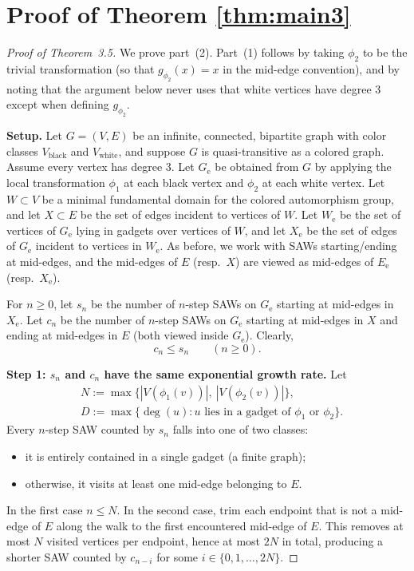 \documentclass[12pt]{amsart}
\theoremstyle{plain}
\numberwithin{equation}{section}
\numberwithin{theorem}{section}
\numberwithin{figure}{section}
\begin{document}
\section{Proof of Theorem \ref{thm:main3}}\label{sec:proof3}



\begin{proof}[Proof of Theorem~3.5]
We prove part~(2). Part~(1) follows by taking $\phi_2$ to be the trivial
transformation (so that $g_{\phi_2}(x)=x$ in the mid-edge convention), and by
noting that the argument below never uses that white vertices have degree $3$
except when defining $g_{\phi_2}$.

\medskip
\noindent\textbf{Setup.}
Let $G=(V,E)$ be an infinite, connected, bipartite graph with color classes
$V_{\mathrm{black}}$ and $V_{\mathrm{white}}$, and suppose $G$ is quasi-transitive as a colored graph.
Assume every vertex has degree $3$.
Let $G_{\mathrm e}$ be obtained from $G$ by applying the local transformation
$\phi_1$ at each black vertex and $\phi_2$ at each white vertex.
Let $W\subset V$ be a minimal fundamental domain for the colored automorphism group,
and let $X\subset E$ be the set of edges incident to vertices of $W$.
Let $W_{\mathrm e}$ be the set of vertices of $G_{\mathrm e}$ lying in gadgets
over vertices of $W$, and let $X_{\mathrm e}$ be the set of edges of $G_{\mathrm e}$
incident to vertices in $W_{\mathrm e}$.
As before, we work with SAWs starting/ending at mid-edges, and the mid-edges of $E$
(resp.\ $X$) are viewed as mid-edges of $E_{\mathrm e}$ (resp.\ $X_{\mathrm e}$).

For $n\ge0$, let $s_n$ be the number of $n$-step SAWs on $G_{\mathrm e}$ starting at
mid-edges in $X_{\mathrm e}$.
Let $c_n$ be the number of $n$-step SAWs on $G_{\mathrm e}$ starting at mid-edges in $X$
and ending at mid-edges in $E$ (both viewed inside $G_{\mathrm e}$).
Clearly,
\begin{equation}\label{eq:cn-le-sn}
c_n \le s_n \qquad (n\ge0).
\end{equation}

\medskip
\noindent\textbf{Step 1: $s_n$ and $c_n$ have the same exponential growth rate.}
Let
\begin{align*}
&N:=\max\{|V(\phi_1(v))|,\ |V(\phi_2(v))|\},\\
&D:=\max\{\deg(u): u\text{ lies in a gadget of }\phi_1\text{ or }\phi_2\}.
\end{align*}
Every $n$-step SAW counted by $s_n$ falls into one of two classes:
\begin{itemize}
\item it is entirely contained in a single gadget (a finite graph);
\item otherwise, it visits at least one mid-edge belonging to $E$.
\end{itemize}
In the first case $n\leq N$.
In the second case, trim each endpoint that is not a mid-edge of $E$ along the walk
to the first encountered mid-edge of $E$. This removes at most $N$ visited vertices
per endpoint, hence at most $2N$ in total, producing a shorter SAW counted by
$c_{n-i}$ for some $i\in\{0,1,\dots,2N\}$.


\end{proof}
\end{document}
